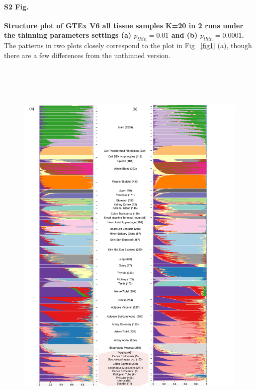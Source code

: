\documentclass[10pt,letterpaper]{article}
\begin{document}
\paragraph*{S2 Fig.}
\label{figS1}  
{\bf Structure plot of GTEx V6 all tissue samples K=20 in 2 runs under the thinning parameters settings (a) $p_{thin}=0.01$ and (b) $p_{thin}=0.0001$.} The patterns in two plots closely correspond to the plot in Fig ~\ref{fig1} (a), though there are a few differences from the unthinned version. 
\begin{figure}[ht]
\centering
\includegraphics[height=7.5in, width=6.5in]{../plots/gtex-figures/gtex_thinned_04_25_2016.pdf}
\end{figure}
\clearpage
\end{document}
